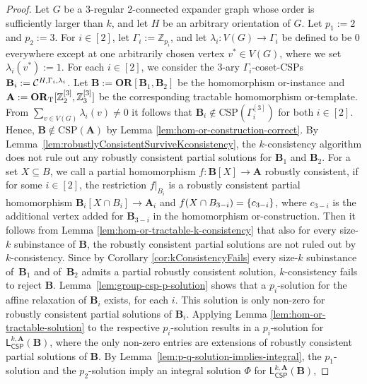 \documentclass[a4paper,english, thm-restate]{lipics-v2021}
\newcommand{\ZZ}{\mathbb{Z}}
\DeclarePairedDelimiter\set{\lbrace}{\rbrace}
\newcommand{\StructA}{\mathbf{A}}
\newcommand{\StructB}{\mathbf{B}}
\newcommand{\CSP}[1]{\mathrm{CSP}(#1)}
\newcommand{\restrict}[2]{#1|_{#2}}
\newcommand{\leqs}{\mathsf{L}}
\newcommand{\cspiso}[3]{\leqs^{#1,#2}_{\mathsf{CSP}}(#3)}
\newcommand{\CosetGrpTmplt}[2]{#1^{[#2]}}
\newcommand{\OR}[1]{\mathbf{OR}[#1]}
\begin{document}
	
	
	
	\zAffineDoesNotSolveBoundedColorClass*
	\begin{proof}
		Let $G$ be a $3$\nobreakdash-regular $2$\nobreakdash-connected expander graph whose order is sufficiently larger than $k$, and let $H$ be an arbitrary orientation of $G$.
		Let $p_1 := 2$ and $p_2 := 3$. For $i \in [2]$, let $\Gamma_i := \ZZ_{p_i}$, and let $\lambda_i: V(G) \to \Gamma_i$ be defined to be $0$ everywhere except at one arbitrarily chosen vertex $v^* \in V(G)$, where we set $\lambda_i(v^*) := 1$.
		For each $i \in [2]$, we consider the $3$-ary $\Gamma_i$-coset-CSPs $\StructB_i := \grpCSP{H}{\Gamma_i}{\lambda_i}$. 
		Let $\StructB := \OR{\StructB_1,\StructB_2} $ be the homomorphism or-instance 
		and $\StructA := \ZtwoOrThreeInst$ be the corresponding
		tractable homomorphism or-template.
		From $\sum_{v\in V(G)} \lambda_i(v) \neq 0$
		it follows that $\StructB_i\notin\CSP{\CosetGrpTmplt{\Gamma_i}{3}}$ for both $i \in [2]$.
		Hence,  $\StructB\notin \CSP{\StructA}$  by Lemma \ref{lem:hom-or-construction-correct}.
		By Lemma~\ref{lem:robustlyConsistentSurviveKconsistency}, the $k$\nobreakdash-consistency algorithm does not rule out any robustly consistent partial solutions for $\StructB_1$ and $\StructB_2$.
		For a set $X\subseteq B$,
		we call a partial homomorphism $f\colon\StructB[X] \to\StructA$ robustly consistent,
		if for some $i \in [2]$, the restriction $\restrict{f}{B_i}$
		is a robustly consistent partial homomorphism $\StructB_i[X\cap B_i] \to \StructA_i$
		and $f(X\cap B_{3-i}) = \set{c_{3-i}}$, where $c_{3-i}$
		is the additional vertex added for $\StructB_{3-i}$ in the homomorphism or-construction.
		Then it follows from Lemma \ref{lem:hom-or-tractable-k-consistency} that also for every size-$k$ subinstance of $\StructB$, the robustly consistent partial solutions are not ruled out by $k$-consistency.
		Since by Corollary \ref{cor:kConsistencyFails} 
		every size-$k$ subinstance of~$\StructB_1$ and of~$\StructB_2$ admits a partial robustly consistent solution,
		$k$\nobreakdash-consistency fails to reject $\StructB$.
		Lemma~\ref{lem:group-csp-p-solution} shows that a  $p_i$-solution for the affine relaxation of $\StructB_i$ exists, for each $i$. This solution is only non-zero for robustly consistent partial solutions of $\StructB_i$. 
		Applying Lemma \ref{lem:hom-or-tractable-solution} to the respective $p_i$-solution results in a $p_i$-solution for $\cspiso{k}{\StructA}{\StructB}$, where the only non-zero entries are extensions of robustly consistent partial solutions of $\StructB$.
		By Lemma~\ref{lem:p-q-solution-implies-integral}, the $p_1$-solution and the $p_2$-solution imply an integral solution $\Phi$ for $\cspiso{k}{\StructA}{\StructB}$,

\end{proof}
\end{document}
